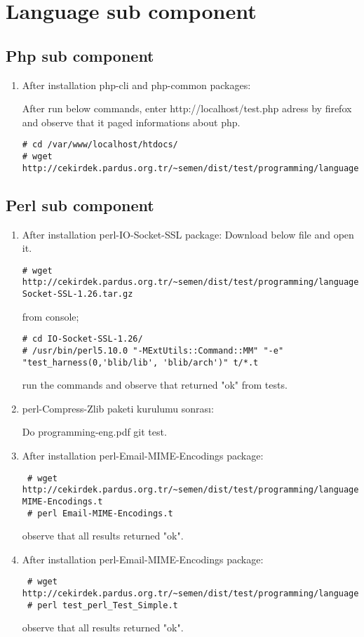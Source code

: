 \documentclass[a4paper,10pt]{article}
\begin{document}
\section{Language sub component}
\subsection{Php sub component}
\begin{enumerate}
 \item After installation php-cli and php-common packages:

After run below commands, enter http://localhost/test.php adress by firefox and observe that it paged informations about php.

\begin{verbatim}
# cd /var/www/localhost/htdocs/
# wget http://cekirdek.pardus.org.tr/~semen/dist/test/programming/language/php/test.php 
\end{verbatim}

\end{enumerate}


\subsection{Perl sub component}
\begin{enumerate}
\item After installation perl-IO-Socket-SSL package:
Download below file and open it.
\begin{verbatim}
# wget http://cekirdek.pardus.org.tr/~semen/dist/test/programming/language/perl/IO-Socket-SSL-1.26.tar.gz
\end{verbatim}

from console;
\begin{verbatim}
# cd IO-Socket-SSL-1.26/
# /usr/bin/perl5.10.0 "-MExtUtils::Command::MM" "-e" "test_harness(0,'blib/lib', 'blib/arch')" t/*.t
\end{verbatim}

run the commands and observe that returned "ok" from tests.
\item perl-Compress-Zlib paketi kurulumu sonrası:

Do programming-eng.pdf git test.

\item After installation perl-Email-MIME-Encodings package:
\begin{verbatim}
 # wget http://cekirdek.pardus.org.tr/~semen/dist/test/programming/language/perl/Email-MIME-Encodings.t
 # perl Email-MIME-Encodings.t
\end{verbatim}

observe that all results returned "ok". 

\item After installation perl-Email-MIME-Encodings package:
\begin{verbatim}
 # wget http://cekirdek.pardus.org.tr/~semen/dist/test/programming/language/perl/test_perl_Test_Simple.t
 # perl test_perl_Test_Simple.t
\end{verbatim}

observe that all results returned "ok". 


\end{enumerate}
\end{document}
